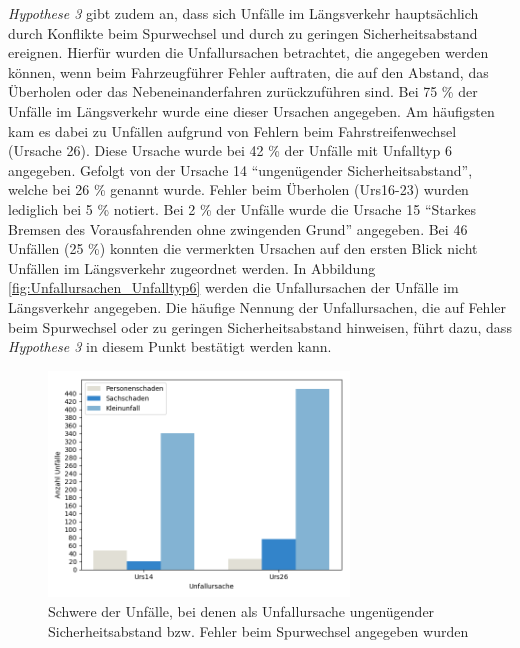 \textit{Hypothese 3} gibt zudem an, dass sich Unfälle im Längsverkehr hauptsächlich durch Konflikte beim Spurwechsel und durch zu geringen Sicherheitsabstand ereignen. Hierfür wurden die Unfallursachen betrachtet, die angegeben werden können, wenn beim Fahrzeugführer Fehler auftraten, die auf den Abstand, das Überholen oder das Nebeneinanderfahren zurückzuführen sind. Bei 75 \% der Unfälle im Längsverkehr wurde eine dieser Ursachen angegeben. Am häufigsten kam es dabei zu Unfällen aufgrund von Fehlern beim Fahrstreifenwechsel (Ursache 26). Diese Ursache wurde bei 42 \% der Unfälle mit Unfalltyp 6 angegeben. Gefolgt von der Ursache 14 \enquote{ungenügender Sicherheitsabstand}, welche bei 26 \% genannt wurde. Fehler beim Überholen (Urs16-23) wurden lediglich bei 5 \% notiert. Bei 2 \% der Unfälle wurde die Ursache 15 \enquote{Starkes Bremsen des Vorausfahrenden ohne zwingenden Grund} angegeben. Bei 46 Unfällen (25 \%) konnten die vermerkten Ursachen auf den ersten Blick nicht Unfällen im Längsverkehr zugeordnet werden. In Abbildung \ref{fig:Unfallursachen_Unfalltyp6} werden die Unfallursachen der Unfälle im Längsverkehr angegeben. Die häufige Nennung der Unfallursachen, die auf Fehler beim Spurwechsel oder zu geringen Sicherheitsabstand hinweisen, führt dazu, dass \textit{Hypothese 3} in diesem Punkt bestätigt werden kann.

\begin{savenotes}
	\begin{figure}[H]
		\centering
		\includegraphics[width=8cm,height=6cm]{figures/Urs14_Urs26_Md}
		\caption[Schwere der Unfälle, bei denen als Unfallursache ungenügender Sicherheitsabstand bzw. Fehler beim Spurwechsel angegeben wurden]{Schwere der Unfälle, bei denen als Unfallursache ungenügender Sicherheitsabstand bzw. Fehler beim Spurwechsel angegeben wurden}\label{fig:Unfallursachen_14_26}
	\end{figure}
\end{savenotes}

